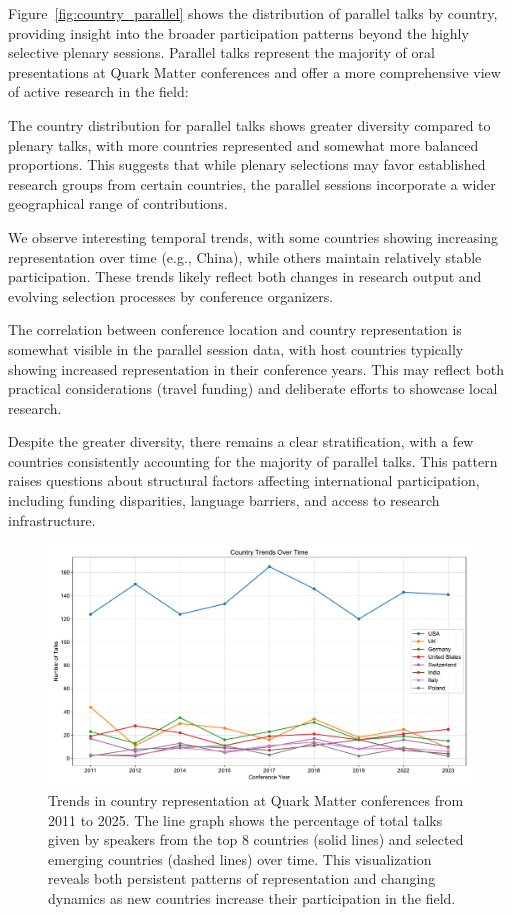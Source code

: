 \documentclass[a4paper,11pt]{article}
\begin{document}
Figure~\ref{fig:country_parallel} shows the distribution of parallel talks by country, providing insight into the broader participation patterns beyond the highly selective plenary sessions. Parallel talks represent the majority of oral presentations at Quark Matter conferences and offer a more comprehensive view of active research in the field:

The country distribution for parallel talks shows greater diversity compared to plenary talks, with more countries represented and somewhat more balanced proportions. This suggests that while plenary selections may favor established research groups from certain countries, the parallel sessions incorporate a wider geographical range of contributions.

We observe interesting temporal trends, with some countries showing increasing representation over time (e.g., China), while others maintain relatively stable participation. These trends likely reflect both changes in research output and evolving selection processes by conference organizers.

The correlation between conference location and country representation is somewhat visible in the parallel session data, with host countries typically showing increased representation in their conference years. This may reflect both practical considerations (travel funding) and deliberate efforts to showcase local research.

Despite the greater diversity, there remains a clear stratification, with a few countries consistently accounting for the majority of parallel talks. This pattern raises questions about structural factors affecting international participation, including funding disparities, language barriers, and access to research infrastructure.

\begin{figure}[H]
\centering
\includegraphics[width=\textwidth]{figures/country_trends_over_time.pdf}
\caption{Trends in country representation at Quark Matter conferences from 2011 to 2025. The line graph shows the percentage of total talks given by speakers from the top 8 countries (solid lines) and selected emerging countries (dashed lines) over time. This visualization reveals both persistent patterns of representation and changing dynamics as new countries increase their participation in the field.}
\label{fig:country_trends}
\end{figure}
\end{document}
